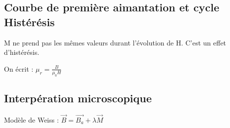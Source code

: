 \documentclass[french]{yLectureNote}
\renewcommand{\vec}{\overrightarrow}
\begin{document}
\subsection{Courbe de première aimantation et cycle Histérésis}
M ne prend pas les mêmes valeurs durant l'évolution de H. C'est un effet d'histérésis.

On écrit : $\mu_r = \frac{B}{\mu_0H}$
\subsection{Interpération microscopique}
\begin{definition}
    Modèle de Weiss : $\vec{B} = \vec{B_a}+\lambda \vec{M}$
\end{definition}
\end{document}
